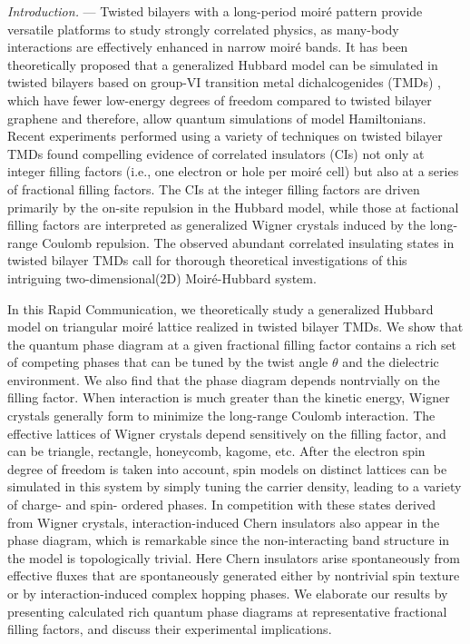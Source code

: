 \documentclass[aps,prl,floatfix,twocolumn]{revtex4-1}
\begin{document}
\textit{Introduction.} --- Twisted bilayers with a long-period moir\'e pattern provide versatile platforms to study strongly correlated physics, as many-body interactions are effectively enhanced in narrow moir\'e bands. It has been theoretically proposed that a generalized Hubbard model can be simulated in twisted bilayers based on  group-VI transition metal dichalcogenides (TMDs) \cite{wu2018hubbard, wu2019topological}, which have fewer low-energy degrees of freedom compared to twisted bilayer graphene \cite{bistritzer2011moirea, cao2018unconventional,cao2018correlated} and therefore, allow quantum simulations of model Hamiltonians.  Recent experiments \cite{regan2020mott,tang2020simulation,wang2020correlated,xu2020abundance,jin2020stripe,huang2020correlated} performed using a variety of techniques on twisted bilayer TMDs found compelling  evidence of correlated insulators (CIs) not only at integer filling factors (i.e., one electron or hole per moir\'e cell) but also at a series of fractional filling factors. The CIs at the integer filling factors are  driven primarily by the on-site repulsion in the Hubbard model, while those at factional filling factors are interpreted as generalized Wigner crystals \cite{regan2020mott,xu2020abundance,jin2020stripe,huang2020correlated} induced by the long-range Coulomb repulsion. The observed abundant correlated insulating states in twisted bilayer TMDs call for thorough theoretical investigations of this intriguing two-dimensional(2D) Moir\'e-Hubbard system.

In this Rapid Communication, we theoretically study a generalized Hubbard model on triangular moir\'e lattice realized in twisted bilayer TMDs. We show that the quantum phase diagram at a given fractional filling factor contains a rich set of competing phases that can be tuned by the twist angle $\theta$ and the dielectric environment. We also find that the phase diagram depends nontrvially on the filling factor. When interaction is much greater than the kinetic energy,  Wigner crystals generally form to minimize the long-range Coulomb interaction. The effective lattices of Wigner crystals depend sensitively on the filling factor, and can be triangle, rectangle, honeycomb, kagome, etc. After the electron spin degree of freedom is taken into account, spin models on distinct lattices can be simulated in this system by simply tuning the carrier density, leading to a variety of charge- and spin- ordered phases. In competition with these states derived from Wigner crystals, interaction-induced Chern insulators also appear in the phase diagram, which is remarkable since the non-interacting band structure in the model is topologically trivial. Here Chern insulators arise spontaneously from effective fluxes that are spontaneously generated either by nontrivial spin texture or by interaction-induced complex hopping phases. We elaborate our results by presenting calculated rich quantum phase diagrams at representative fractional filling factors, and discuss their experimental implications. 
\end{document}
